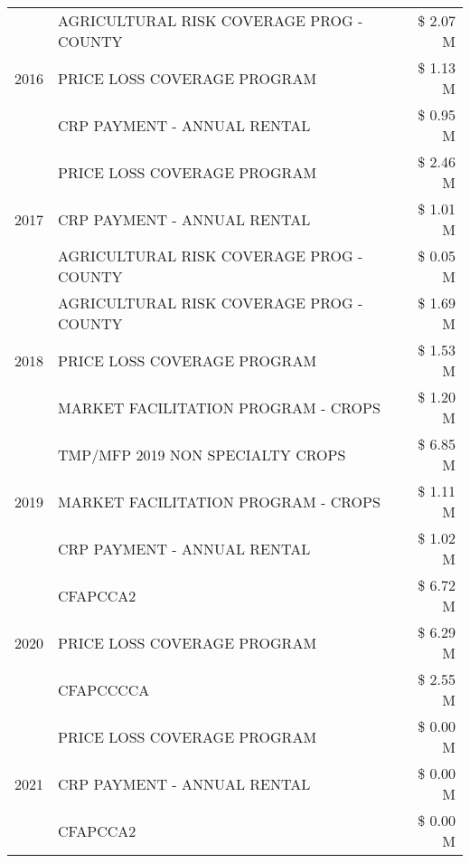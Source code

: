 \begin{tabular}{llr}
\cline{1-3}
\multirow[t]{3}{*}{2016} & AGRICULTURAL RISK COVERAGE PROG - COUNTY & \$ 2.07 M \\
 & PRICE LOSS COVERAGE PROGRAM & \$ 1.13 M \\
 & CRP PAYMENT - ANNUAL RENTAL & \$ 0.95 M \\
\cline{1-3}
\multirow[t]{3}{*}{2017} & PRICE LOSS COVERAGE PROGRAM & \$ 2.46 M \\
 & CRP PAYMENT - ANNUAL RENTAL & \$ 1.01 M \\
 & AGRICULTURAL RISK COVERAGE PROG - COUNTY & \$ 0.05 M \\
\cline{1-3}
\multirow[t]{3}{*}{2018} & AGRICULTURAL RISK COVERAGE PROG - COUNTY & \$ 1.69 M \\
 & PRICE LOSS COVERAGE PROGRAM & \$ 1.53 M \\
 & MARKET FACILITATION PROGRAM - CROPS & \$ 1.20 M \\
\cline{1-3}
\multirow[t]{3}{*}{2019} & TMP/MFP 2019 NON SPECIALTY CROPS & \$ 6.85 M \\
 & MARKET FACILITATION PROGRAM - CROPS & \$ 1.11 M \\
 & CRP PAYMENT - ANNUAL RENTAL & \$ 1.02 M \\
\cline{1-3}
\multirow[t]{3}{*}{2020} & CFAPCCA2 & \$ 6.72 M \\
 & PRICE LOSS COVERAGE PROGRAM & \$ 6.29 M \\
 & CFAPCCCCA & \$ 2.55 M \\
\cline{1-3}
\multirow[t]{3}{*}{2021} & PRICE LOSS COVERAGE PROGRAM & \$ 0.00 M \\
 & CRP PAYMENT - ANNUAL RENTAL & \$ 0.00 M \\
 & CFAPCCA2 & \$ 0.00 M \\
\cline{1-3}
\bottomrule
\end{tabular}
